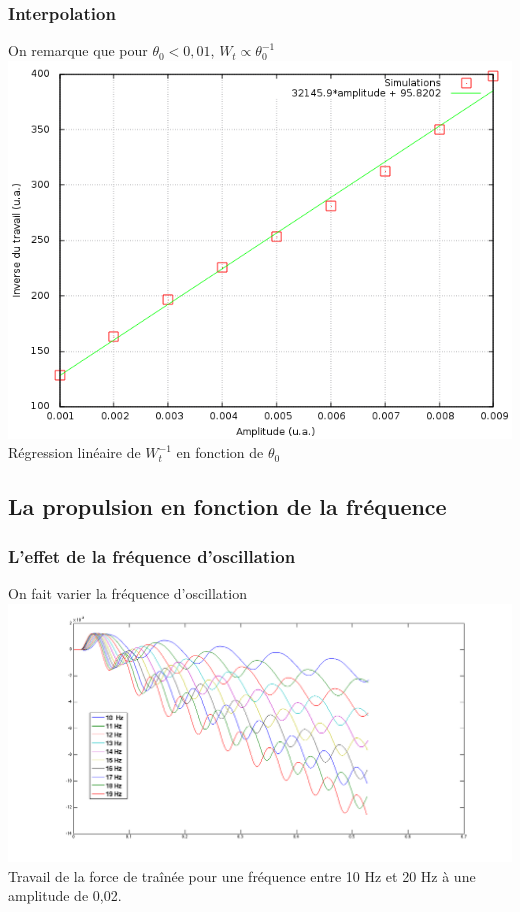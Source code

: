 \documentclass{beamer}
\begin{document}
  	\begin{frame}
 		\frametitle{Interpolation}
 		On remarque que pour $ \theta_0 < 0,01$, $W_t \propto \theta_0^{-1}$
 		\centering \includegraphics[width= 0.8 \linewidth]{9_courbes_extraites.png}\\
 		Régression linéaire de $W_t^{-1}$ en fonction de $\theta_0$
 	\end{frame}

 \subsection{La propulsion en fonction de la fréquence}
 	
 	\begin{frame}
 		\frametitle{L'effet de la fréquence d'oscillation}
 			On fait varier la fréquence d'oscillation
 			\centering \includegraphics[width= 0.8 \linewidth]{freq0,02.png}\\
 			Travail de la force de traînée pour une fréquence entre 10 Hz et 20 Hz à une amplitude de 0,02\degre.
 	\end{frame}
 	
\end{document}
